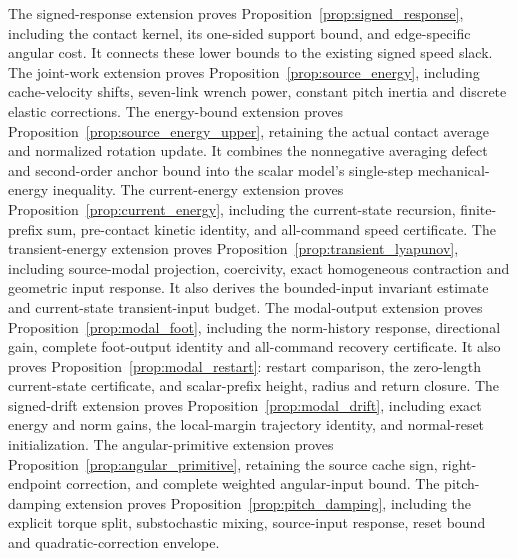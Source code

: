 The signed-response extension proves Proposition~\ref{prop:signed_response}, including the contact kernel, its one-sided support bound, and edge-specific angular cost.
It connects these lower bounds to the existing signed speed slack.
The joint-work extension proves Proposition~\ref{prop:source_energy}, including cache-velocity shifts, seven-link wrench power, constant pitch inertia and discrete elastic corrections.
The energy-bound extension proves Proposition~\ref{prop:source_energy_upper}, retaining the actual contact average and normalized rotation update.
It combines the nonnegative averaging defect and second-order anchor bound into the scalar model's single-step mechanical-energy inequality.
The current-energy extension proves Proposition~\ref{prop:current_energy}, including the current-state recursion, finite-prefix sum, pre-contact kinetic identity, and all-command speed certificate.
The transient-energy extension proves Proposition~\ref{prop:transient_lyapunov}, including source-modal projection, coercivity, exact homogeneous contraction and geometric input response.
It also derives the bounded-input invariant estimate and current-state transient-input budget.
The modal-output extension proves Proposition~\ref{prop:modal_foot}, including the norm-history response, directional gain, complete foot-output identity and all-command recovery certificate.
It also proves Proposition~\ref{prop:modal_restart}: restart comparison, the zero-length current-state certificate, and scalar-prefix height, radius and return closure.
The signed-drift extension proves Proposition~\ref{prop:modal_drift}, including exact energy and norm gains, the local-margin trajectory identity, and normal-reset initialization.
The angular-primitive extension proves Proposition~\ref{prop:angular_primitive}, retaining the source cache sign, right-endpoint correction, and complete weighted angular-input bound.
The pitch-damping extension proves Proposition~\ref{prop:pitch_damping}, including the explicit torque split, substochastic mixing, source-input response, reset bound and quadratic-correction envelope.

